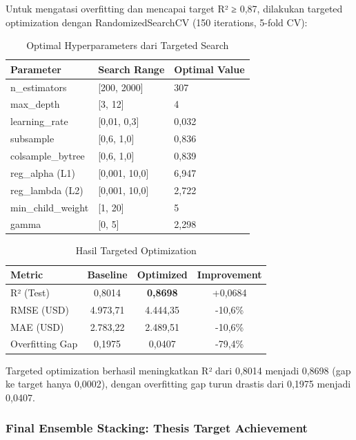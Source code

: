 Untuk mengatasi overfitting dan mencapai target R² ≥ 0,87, dilakukan targeted optimization dengan RandomizedSearchCV (150 iterations, 5-fold CV):

\begin{table}[H]
\centering
\caption{Optimal Hyperparameters dari Targeted Search}
\label{tab:optimal-hyperparameters}
\begin{tabular}{|l|l|l|}
\hline
\textbf{Parameter} & \textbf{Search Range} & \textbf{Optimal Value} \\
\hline
n\_estimators & [200, 2000] & 307 \\
max\_depth & [3, 12] & 4 \\
learning\_rate & [0,01, 0,3] & 0,032 \\
subsample & [0,6, 1,0] & 0,836 \\
colsample\_bytree & [0,6, 1,0] & 0,839 \\
reg\_alpha (L1) & [0,001, 10,0] & 6,947 \\
reg\_lambda (L2) & [0,001, 10,0] & 2,722 \\
min\_child\_weight & [1, 20] & 5 \\
gamma & [0, 5] & 2,298 \\
\hline
\end{tabular}
\end{table}

\begin{table}[H]
\centering
\caption{Hasil Targeted Optimization}
\label{tab:targeted-results}
\begin{tabular}{|l|c|c|c|}
\hline
\textbf{Metric} & \textbf{Baseline} & \textbf{Optimized} & \textbf{Improvement} \\
\hline
R² (Test) & 0,8014 & \textbf{0,8698} & +0,0684 \\
RMSE (USD) & 4.973,71 & 4.444,35 & -10,6\% \\
MAE (USD) & 2.783,22 & 2.489,51 & -10,6\% \\
Overfitting Gap & 0,1975 & 0,0407 & -79,4\% \\
\hline
\end{tabular}
\end{table}

Targeted optimization berhasil meningkatkan R² dari 0,8014 menjadi 0,8698 (gap ke target hanya 0,0002), dengan overfitting gap turun drastis dari 0,1975 menjadi 0,0407.

\subsubsection{Final Ensemble Stacking: Thesis Target Achievement}

